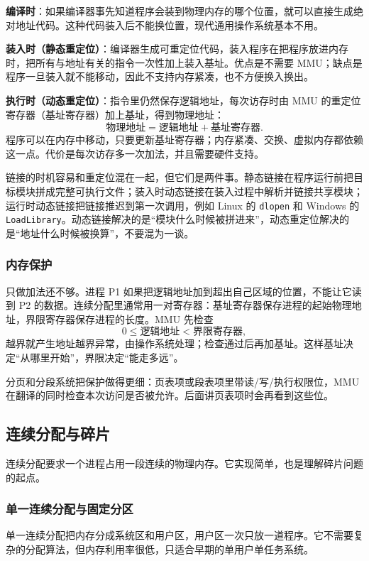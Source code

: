 \textbf{编译时}：如果编译器事先知道程序会装到物理内存的哪个位置，就可以直接生成绝对地址代码。这种代码装入后不能换位置，现代通用操作系统基本不用。

\textbf{装入时（静态重定位）}：编译器生成可重定位代码，装入程序在把程序放进内存时，把所有与地址有关的指令一次性加上装入基址。优点是不需要 MMU；缺点是程序一旦装入就不能移动，因此不支持内存紧凑，也不方便换入换出。

\textbf{执行时（动态重定位）}：指令里仍然保存逻辑地址，每次访存时由 MMU 的重定位寄存器（基址寄存器）加上基址，得到物理地址：
\[
\text{物理地址} = \text{逻辑地址} + \text{基址寄存器}.
\]
程序可以在内存中移动，只要更新基址寄存器；内存紧凑、交换、虚拟内存都依赖这一点。代价是每次访存多一次加法，并且需要硬件支持。

链接的时机容易和重定位混在一起，但它们是两件事。静态链接在程序运行前把目标模块拼成完整可执行文件；装入时动态链接在装入过程中解析并链接共享模块；运行时动态链接把链接推迟到第一次调用，例如 Linux 的 \texttt{dlopen} 和 Windows 的 \texttt{LoadLibrary}。动态链接解决的是“模块什么时候被拼进来”，动态重定位解决的是“地址什么时候被换算”，不要混为一谈。

\subsubsection{内存保护}

只做加法还不够。进程 P1 如果把逻辑地址加到超出自己区域的位置，不能让它读到 P2 的数据。连续分配里通常用一对寄存器：基址寄存器保存进程的起始物理地址，界限寄存器保存进程的长度。MMU 先检查
\[
0 \le \text{逻辑地址} < \text{界限寄存器},
\]
越界就产生地址越界异常，由操作系统处理；检查通过后再加基址。这样基址决定“从哪里开始”，界限决定“能走多远”。

分页和分段系统把保护做得更细：页表项或段表项里带读/写/执行权限位，MMU 在翻译的同时检查本次访问是否被允许。后面讲页表项时会再看到这些位。

\subsection{连续分配与碎片}

连续分配要求一个进程占用一段连续的物理内存。它实现简单，也是理解碎片问题的起点。

\subsubsection{单一连续分配与固定分区}

单一连续分配把内存分成系统区和用户区，用户区一次只放一道程序。它不需要复杂的分配算法，但内存利用率很低，只适合早期的单用户单任务系统。

